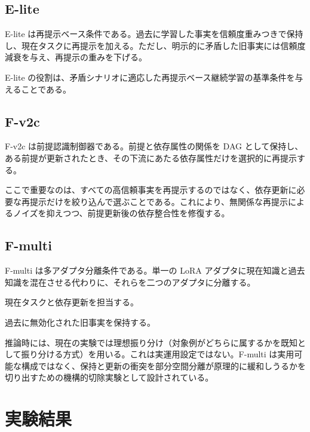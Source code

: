 \documentclass[12pt,a4paper]{article}
\begin{document}
\subsection{E-lite}\label{e-lite}

E-lite は再提示ベース条件である。過去に学習した事実を信頼度重みつきで保持し、現在タスクに再提示を加える。ただし、明示的に矛盾した旧事実には信頼度減衰を与え、再提示の重みを下げる。

E-lite の役割は、矛盾シナリオに適応した再提示ベース継続学習の基準条件を与えることである。

\subsection{F-v2c}\label{f-v2c}

F-v2c は前提認識制御器である。前提と依存属性の関係を DAG として保持し、ある前提が更新されたとき、その下流にあたる依存属性だけを選択的に再提示する。

ここで重要なのは、すべての高信頼事実を再提示するのではなく、依存更新に必要な再提示だけを絞り込んで選ぶことである。これにより、無関係な再提示によるノイズを抑えつつ、前提更新後の依存整合性を修復する。

\subsection{F-multi}\label{f-multi}

F-multi は多アダプタ分離条件である。単一の LoRA アダプタに現在知識と過去知識を混在させる代わりに、それらを二つのアダプタに分離する。

\begin{definition}[現在アダプタ]
現在タスクと依存更新を担当する。
\end{definition}

\begin{definition}[保持アダプタ]
過去に無効化された旧事実を保持する。
\end{definition}

推論時には、現在の実験では理想振り分け（対象例がどちらに属するかを既知として振り分ける方式）を用いる。これは実運用設定ではない。F-multi は実用可能な構成ではなく、保持と更新の衝突を部分空間分離が原理的に緩和しうるかを切り出すための機構的切除実験として設計されている。

\section{実験結果}\label{ux5b9fux9a13ux7d50ux679c}
\end{document}
